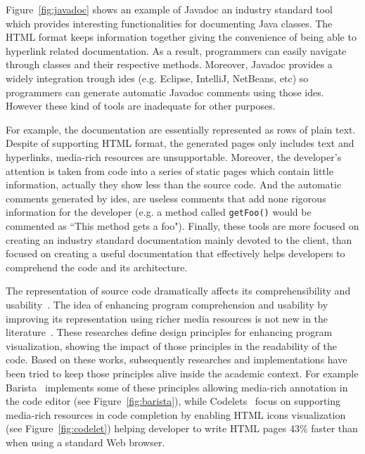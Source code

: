 Figure~\ref{fig:javadoc} shows an example of Javadoc an industry standard tool which provides interesting functionalities for documenting Java classes. The HTML format keeps information together giving the convenience of being able to hyperlink related documentation. As a result, programmers can easily navigate through classes and their respective methods. Moreover, Javadoc provides a widely integration trough \glspl{ide} (e.g. Eclipse, IntelliJ, NetBeans, etc) so programmers can generate automatic Javadoc comments using those \glspl{ide}. However these kind of tools are inadequate for other purposes.

For example, the documentation are essentially represented as rows of plain text. Despite of supporting HTML format, the generated pages only includes text and hyperlinks, media-rich resources are unsupportable. Moreover, the developer's attention is taken from code into a series of static pages which contain little information, actually they show less than the source code. And the automatic comments generated by \glspl{ide}, are useless comments that add none rigorous information for the developer (e.g. a method called \texttt{getFoo()} would be commented as ``This method gets a foo"). Finally, these tools are more focused on creating an industry standard documentation mainly devoted to the client, than focused on creating a useful documentation that effectively helps developers to comprehend the code and its architecture.

The representation of source code dramatically affects its comprehensibility and usability~\citep{baecker1986design}. The idea of enhancing program comprehension and usability by improving its representation using richer media resources is not new in the literature~\citep{marcus1982graphic,baecker1986design,baecker1983enhancing}. These researches define design principles for enhancing program visualization, showing the impact of those principles in the readability of the code. Based on these works, subsequently researches and implementations have been tried to keep those principles alive inside the academic context. For example Barista~\citep{ko2006barista} implements some of these principles  allowing media-rich annotation in the code editor (see Figure~\ref{fig:barista}), while Codelets~\citep{oney2012codelets} focus on supporting media-rich resources in code completion by enabling HTML icons visualization (see Figure~\ref{fig:codelet}) helping developer to write HTML pages 43\% faster than when using a standard Web browser\citep{oney2012codelets}.

